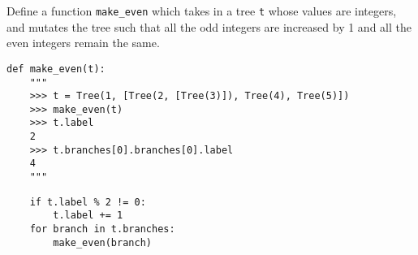 \question Define a function \texttt{make\_even} which takes in a tree
\texttt{t} whose values are integers, and mutates the tree such that all the
odd integers are increased by 1 and all the even integers remain the same.

\begin{lstlisting}
def make_even(t):
    """
    >>> t = Tree(1, [Tree(2, [Tree(3)]), Tree(4), Tree(5)])
    >>> make_even(t)
    >>> t.label
    2
    >>> t.branches[0].branches[0].label
    4
    """
\end{lstlisting}
\begin{solution}[1.10in]
\begin{lstlisting}
    if t.label % 2 != 0:
        t.label += 1
    for branch in t.branches:
        make_even(branch)
\end{lstlisting}
\end{solution}
